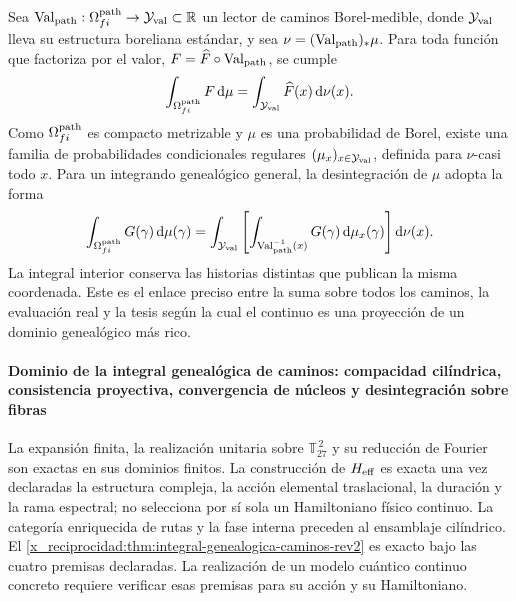 Sea
\(\operatorname{Val}_{\rm path}:\Omega^{\rm path}_{fi}\to\mathcal Y_{\rm val}\subset\mathbb R\)
un lector de caminos Borel-medible, donde \(\mathcal Y_{\rm val}\) lleva su estructura
boreliana estándar, y sea
\(\nu=(\operatorname{Val}_{\rm path})_*\mu\). Para toda función que
factoriza por el valor, \(F=\widehat F\circ\operatorname{Val}_{\rm path}\),
se cumple
\[
 \int_{\Omega^{\rm path}_{fi}}F\,\mathrm d\mu
 =\int_{\mathcal Y_{\rm val}}\widehat F(x)\,\mathrm d\nu(x).
\]
Como \(\Omega^{\rm path}_{fi}\) es compacto metrizable y \(\mu\) es una
probabilidad de Borel, existe una familia de probabilidades condicionales
regulares \((\mu_x)_{x\in\mathcal Y_{\rm val}}\), definida para \(\nu\)-casi todo \(x\). Para
un integrando genealógico general, la desintegración de \(\mu\) adopta la forma
\begin{equation}
 \int_{\Omega^{\rm path}_{fi}}G(\gamma)\,\mathrm d\mu(\gamma)
 =\int_{\mathcal Y_{\rm val}}\left[
   \int_{\operatorname{Val}_{\rm path}^{-1}(x)}
   G(\gamma)\,\mathrm d\mu_x(\gamma)
  \right]\mathrm d\nu(x).
 \label{x_reciprocidad:eq:desintegracion-genealogica-caminos-rev2}
\end{equation}
La integral interior conserva las historias distintas que publican la misma
coordenada. Este es el enlace preciso entre la suma sobre todos los caminos,
la evaluación real y la tesis según la cual el continuo es una proyección de
un dominio genealógico más rico.

\paragraph{Dominio de la integral genealógica de caminos: compacidad cilíndrica, consistencia proyectiva, convergencia de núcleos y desintegración sobre fibras}
La expansión finita, la realización unitaria sobre
\(\mathbb T_{27}^{\,2}\) y su reducción de Fourier son exactas en sus dominios
finitos. La construcción de \(H_{\rm eff}\) es
exacta una vez declaradas la estructura compleja, la acción elemental
traslacional, la duración y la rama espectral; no selecciona por sí sola un
Hamiltoniano físico continuo. La categoría enriquecida de rutas y la fase
interna preceden al ensamblaje cilíndrico. El
\cref{x_reciprocidad:thm:integral-genealogica-caminos-rev2} es exacto bajo las cuatro
premisas declaradas. La realización de un modelo cuántico continuo concreto
requiere verificar esas premisas para su acción y su Hamiltoniano.
